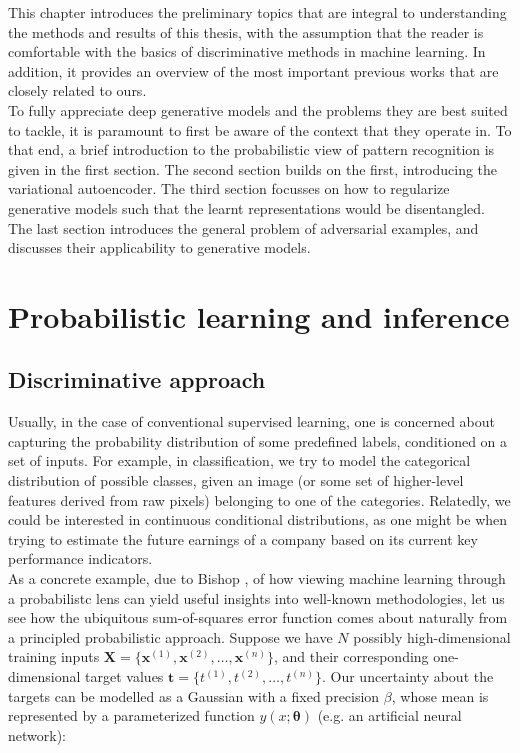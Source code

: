 \documentclass{report}
\begin{document}
This chapter introduces the preliminary topics that are integral to understanding the methods and results of this thesis, with the assumption that the reader is comfortable with the basics of discriminative methods in machine learning. In addition, it provides an overview of the most important previous works that are closely related to ours. \\

\noindent To fully appreciate deep generative models and the problems they are best suited to tackle, it is paramount to first be aware of the context that they operate in. To that end, a brief introduction to the probabilistic view of pattern recognition is given in the first section. The second section builds on the first, introducing the variational autoencoder. The third section focusses on how to regularize generative models such that the learnt representations would be disentangled. The last section introduces the general problem of adversarial examples, and discusses their applicability to generative models.

\section{Probabilistic learning and inference}

\subsection{Discriminative approach}

\noindent Usually, in the case of conventional supervised learning, one is concerned about capturing the probability distribution of some predefined labels, conditioned on a set of inputs. For example, in classification, we try to model the categorical distribution of possible classes, given an image (or some set of higher-level features derived from raw pixels) belonging to one of the categories. Relatedly, we could be interested in continuous conditional distributions, as one might be when trying to estimate the future earnings of a company based on its current key performance indicators. \\

\noindent As a concrete example, due to Bishop \cite{bishop-prml}, of how viewing machine learning through a probabilistc lens can yield useful insights into well-known methodologies, let us see how the ubiquitous sum-of-squares error function comes about naturally from a principled probabilistic approach. Suppose we have $N$ possibly high-dimensional training inputs $\mathbf{\boldsymbol{X}} = \{\boldsymbol{x}^{(1)}, \boldsymbol{x}^{(2)}, \dots, \boldsymbol{x}^{(n)}\}$, and their corresponding one-dimensional target values $\mathbf{t} = \{t^{(1)}, t^{(2)}, \dots, t^{(n)}\}$. Our uncertainty about the targets can be modelled as a Gaussian with a fixed precision $\beta$, whose mean is represented by a parameterized function $y(x; \boldsymbol{\theta})$ (e.g. an artificial neural network):
\end{document}
